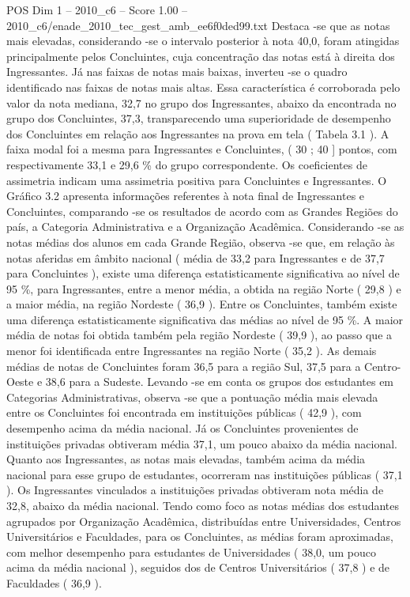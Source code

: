 \begin{textsample}{POS Dim 1 – 2010\_c6 – Score 1.00 – 2010\_c6/enade\_2010\_tec\_gest\_amb\_ee6f0ded99.txt}
Destaca -se que as notas mais elevadas, considerando -se o intervalo posterior à nota 40,0, foram atingidas principalmente pelos Concluintes, cuja concentração das notas está à direita dos Ingressantes.
Já nas faixas de notas mais baixas, inverteu -se o quadro identificado nas faixas de notas mais altas.
Essa característica é corroborada pelo valor da nota mediana, 32,7 no grupo dos Ingressantes, abaixo da encontrada no grupo dos Concluintes, 37,3, transparecendo uma superioridade de desempenho dos Concluintes em relação aos Ingressantes na prova em tela ( Tabela 3.1 ).
A faixa modal foi a mesma para Ingressantes e Concluintes, ( 30 ; 40 ] pontos, com respectivamente 33,1 e 29,6 \% do grupo correspondente.
Os coeficientes de assimetria indicam uma assimetria positiva para Concluintes e Ingressantes.
O Gráfico 3.2 apresenta informações referentes à nota final de Ingressantes e Concluintes, comparando -se os resultados de acordo com as Grandes Regiões do país, a Categoria Administrativa e a Organização Acadêmica.
Considerando -se as notas médias dos alunos em cada Grande Região, observa -se que, em relação às notas aferidas em âmbito nacional ( média de 33,2 para Ingressantes e de 37,7 para Concluintes ), existe uma diferença estatisticamente significativa ao nível de 95 \%, para Ingressantes, entre a menor média, a obtida na região Norte ( 29,8 ) e a maior média, na região Nordeste ( 36,9 ).
Entre os Concluintes, também existe uma diferença estatisticamente significativa das médias ao nível de 95 \%.
A maior média de notas foi obtida também pela região Nordeste ( 39,9 ), ao passo que a menor foi identificada entre Ingressantes na região Norte ( 35,2 ).
As demais médias de notas de Concluintes foram 36,5 para a região Sul, 37,5 para a Centro-Oeste e 38,6 para a Sudeste.
Levando -se em conta os grupos dos estudantes em Categorias Administrativas, observa -se que a pontuação média mais elevada entre os Concluintes foi encontrada em instituições públicas ( 42,9 ), com desempenho acima da média nacional.
Já os Concluintes provenientes de instituições privadas obtiveram média 37,1, um pouco abaixo da média nacional.
Quanto aos Ingressantes, as notas mais elevadas, também acima da média nacional para esse grupo de estudantes, ocorreram nas instituições públicas ( 37,1 ).
Os Ingressantes vinculados a instituições privadas obtiveram nota média de 32,8, abaixo da média nacional.
Tendo como foco as notas médias dos estudantes agrupados por Organização Acadêmica, distribuídas entre Universidades, Centros Universitários e Faculdades, para os Concluintes, as médias foram aproximadas, com melhor desempenho para estudantes de Universidades ( 38,0, um pouco acima da média nacional ), seguidos dos de Centros Universitários ( 37,8 ) e de Faculdades ( 36,9 ).

\end{textsample}
